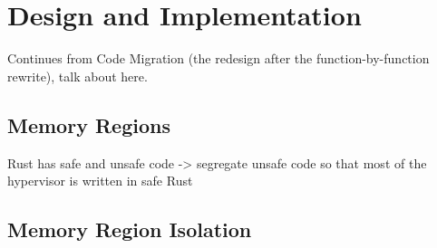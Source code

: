 \chapter{\rustsec{} Design and Implementation}

Continues from Code Migration (the redesign after the function-by-function
rewrite), talk about \rustcore{} here.

\section{\rustcore{} Memory Regions}

Rust has safe and unsafe code -> segregate unsafe code so that most of the
hypervisor is written in safe Rust

\section{Memory Region Isolation}
